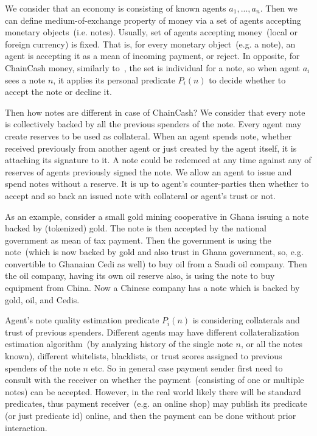 \documentclass{article}   %
\newcommand{\cc}{ChainCash}
\begin{document}
We consider that an economy is consisting of known agents $a_1, ..., a_n$. Then we can define medium-of-exchange property of money via a set of agents accepting monetary objects~(i.e. notes). Usually, set of agents accepting money~(local or foreign currency) is fixed. That is, for every monetary object~(e.g. a note), an agent is accepting it as a mean of incoming payment, or reject. In opposite, for \cc{} money, similarly to~\cite{saito2003peer}, the set is individual for a note, so when agent $a_i$ sees a note $n$, it applies its personal predicate $P_i(n)$ to decide whether to accept the note or decline it. 

Then how notes are different in case of \cc{}? We consider that every note is collectively backed by all the previous spenders of the note. Every agent may create reserves to be used as collateral. When an agent spends note, whether received previously from another agent or just created by the agent itself, it is attaching its signature to it. A note could be redemeed at any time against any of reserves of agents previously signed the note. We allow an agent to issue and spend notes without a reserve. It is up to agent's counter-parties then whether to accept and so back an issued note with collateral or agent's trust or not. 

As an example, consider a small gold mining cooperative in Ghana issuing a note backed by (tokenized) gold. The note is then accepted by the national government as mean of tax payment. Then the government is using the note~(which is now backed by gold and also trust in Ghana government, so, e.g. convertible to Ghanaian Cedi as well) to buy oil from a Saudi oil company. Then the oil company, having its own oil reserve also, is using the note to buy equipment from China. Now a Chinese company has a note which is backed by gold, oil, and Cedis. 

Agent's note quality estimation predicate $P_i(n)$ is considering collaterals and trust of previous spenders. Different agents may have different 
collateralization estimation algorithm~(by analyzing history of the single note $n$, or all the notes known), different whitelists, blacklists, or trust scores assigned to previous spenders of the note $n$ etc. So in general case payment sender first need to consult with the receiver on whether the payment~(consisting of one or multiple notes) can be accepted. However, in the real world likely there will be standard predicates, thus payment receiver~(e.g. an online shop) may publish its predicate (or just predicate id) online, and then the payment can be done without prior interaction.
\end{document}

